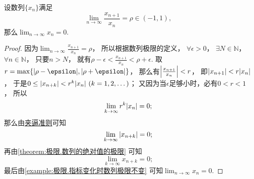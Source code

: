 \begin{proposition}
设数列\(\{x_n\}\)满足\[
	\lim_{n\to\infty} \frac{x_{n+1}}{x_n} = \rho \in (-1,1),
\]
那么\(\lim_{n\to\infty} x_n = 0\).
\begin{proof}
因为\(\lim_{n\to\infty} \frac{x_{n+1}}{x_n} = \rho\)，
所以根据数列极限的定义，
\(\forall\epsilon>0\)，
\(\exists N\in\mathbb{N}\)，
\(\forall n\in\mathbb{N}\)，
只要\(n > N\)，
就有\(\rho-\epsilon < \frac{x_{n+1}}{x_n} < \rho+\epsilon\).
取\(r=\max\{\abs{\rho-\epsilon},\abs{\rho+\epsilon}\}\)，
那么有\(\abs{\frac{x_{n+1}}{x_n}} < r\)，
即\(\abs{x_{n+1}} < r \abs{x_n}\)，
于是\(0 \leq \abs{x_{n+k}} < r^k \abs{x_n}\ (k=1,2,\dotsc)\)；
又因为当\(\epsilon\)足够小时，必有\(0<r<1\)，
所以\[
	\lim_{k\to\infty} r^k \abs{x_n} = 0;
\]
那么由\hyperref[theorem:数列极限.夹逼准则]{夹逼准则}可知\[
	\lim_{k\to\infty} \abs{x_{n+k}} = 0;
\]
再由\cref{theorem:极限.数列的绝对值的极限} 可知\[
	\lim_{k\to\infty} x_{n+k} = 0;
\]
最后由\cref{example:极限.指标变化时数列极限不变} 可知\(\lim_{n\to\infty} x_n = 0\).
\end{proof}
\end{proposition}
